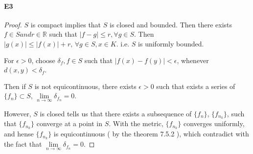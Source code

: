 \documentclass{article}
\begin{document}
\paragraph{E3}
\begin{proof}
     $ S  $ is compact implies that  $ S  $ is closed and bounded. Then there exists $ f\in S and r\in \mathbb{R } $ such that  $ |f-g| \leqslant r ,\forall g\in S  $. Then  $ |g(x)| \leqslant |f(x)|+r,\,\forall g\in S,x\in K $. i.e.  $ S  $ is uniformly bounded.
     
     For  $ \epsilon>0 $, choose  $ \delta_f,f\in S  $ such that  $ |f(x)-f(y)|<\epsilon $, whenever  $ d(x,y)<\delta_f $.
     
     Then if  $ S  $ is not equicontinuous, there exists  $ \epsilon>0 $ such that exists a series of  $ \{f_n \}\subset S   $,  $ \lim\limits_{n\to\infty} \delta_{f_n}=0  $. 
     
     However,  $ S  $ is closed tells us that there exists a subsequence of  $ \{f_n \} $,  $ \{f_{n_k}\} $, such that  $ \{f_{n_k}\} $ converge at a point in  $ S  $. With the metric,  $ \{f_{n_k }\} $ converges uniformly, and hense  $ \{f_{n_k}\} $ is equicontinuous ( by the theorem 7.5.2 ), which contradict with the fact that $ \lim\limits_{n\to\infty} \delta_{f_n}=0 $.   
     
\end{proof}
\end{document}
